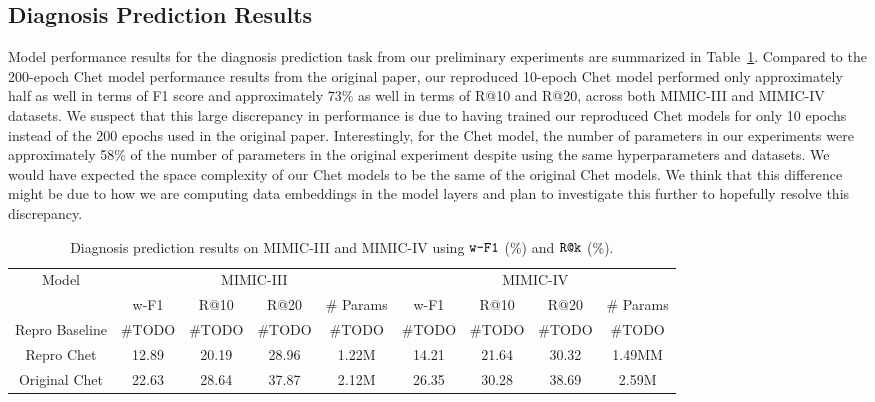 \documentclass[11pt,a4paper,fleqn]{article}
\begin{document}
\subsection{Diagnosis Prediction Results}
Model performance results for the diagnosis prediction task from our preliminary experiments are summarized in Table~\ref{tab:diag}. 
Compared to the 200-epoch Chet model performance results from the original paper, our reproduced 10-epoch Chet 
model performed only approximately half as well in terms of F1 score and approximately 73\% as well in terms of R@10 and R@20, 
across both MIMIC-III and MIMIC-IV datasets. We suspect that this large discrepancy in performance is due to 
having trained our reproduced Chet models for only 10 epochs instead of the 200 epochs used in the original paper.
Interestingly, for the Chet model, the number of parameters in our experiments were approximately 58\% of the number of parameters in the 
original experiment despite using the same hyperparameters and datasets. We would have expected the space complexity of our Chet models to be 
the same of the original Chet models. We think that this difference might be due to how we are computing data embeddings in the model layers 
and plan to investigate this further to hopefully resolve this discrepancy.

\begin{table}[H]
\centering
\begin{tabular}{|c|c|c|c|c|c|c|c|c|} \hline
{Model} & \multicolumn{4}{c|}{MIMIC-III} & \multicolumn{4}{c|}{MIMIC-IV} \\ \cline{2-9} 
 & w-F1 & R@10 & R@20 & \# Params & w-F1 & R@10 & R@20 & \# Params \\ \hline
{Repro Baseline} & \#TODO & \#TODO & \#TODO & \#TODO & \#TODO & \#TODO & \#TODO & \#TODO \\ \cline{1-9}
{Repro Chet} & 12.89 & 20.19 & 28.96 & 1.22M & 14.21 & 21.64 & 30.32 & 1.49MM \\ \cline{1-9}
{Original Chet} & 22.63 & 28.64 & 37.87 & 2.12M & 26.35 & 30.28 & 38.69 & 2.59M \\ \cline{1-9}
\end{tabular}
\caption{Diagnosis prediction results on MIMIC-III and MIMIC-IV using $\verb|w-F1|$ (\%) and $\verb|R@k|$ (\%).}
\label{tab:diag}
\end{table}
\end{document}
